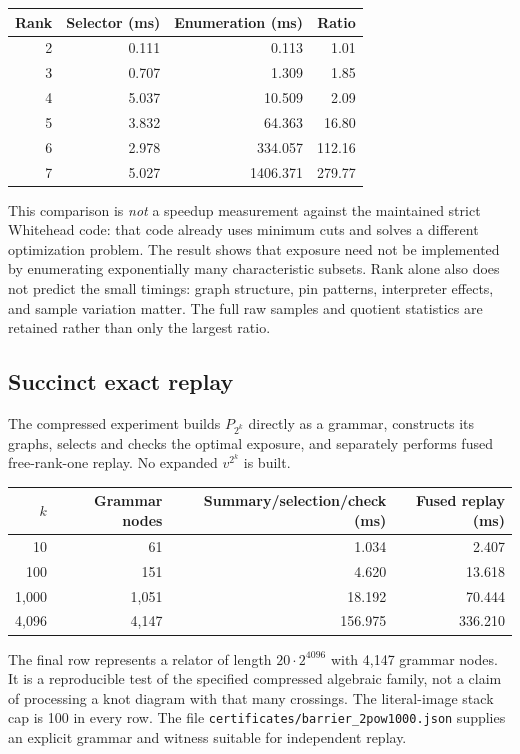 \documentclass[11pt,letterpaper]{article}
\theoremstyle{definition}\newtheorem{definition}[theorem]{Definition}
\begin{document}
\begin{center}
\begin{tabular}{rrrr}
\toprule Rank & Selector (ms) & Enumeration (ms) & Ratio\\\midrule
2 & 0.111 & 0.113 & 1.01\\
3 & 0.707 & 1.309 & 1.85\\
4 & 5.037 & 10.509 & 2.09\\
5 & 3.832 & 64.363 & 16.80\\
6 & 2.978 & 334.057 & 112.16\\
7 & 5.027 & 1406.371 & 279.77\\
\bottomrule
\end{tabular}
\end{center}

This comparison is \emph{not} a speedup measurement against the maintained strict Whitehead code: that code already uses minimum cuts and solves a different optimization problem. The result shows that exposure need not be implemented by enumerating exponentially many characteristic subsets. Rank alone also does not predict the small timings: graph structure, pin patterns, interpreter effects, and sample variation matter. The full raw samples and quotient statistics are retained rather than only the largest ratio.

\subsection{Succinct exact replay}
The compressed experiment builds $P_{2^k}$ directly as a grammar, constructs its graphs, selects and checks the optimal exposure, and separately performs fused free-rank-one replay. No expanded $v^{2^k}$ is built.

\begin{center}
\begin{tabular}{rrrr}
\toprule $k$ & Grammar nodes & Summary/selection/check (ms) & Fused replay (ms)\\\midrule
10 & 61 & 1.034 & 2.407\\
100 & 151 & 4.620 & 13.618\\
1,000 & 1,051 & 18.192 & 70.444\\
4,096 & 4,147 & 156.975 & 336.210\\
\bottomrule
\end{tabular}
\end{center}

The final row represents a relator of length $20\cdot2^{4096}$ with 4,147 grammar nodes. It is a reproducible test of the specified compressed algebraic family, not a claim of processing a knot diagram with that many crossings. The literal-image stack cap is 100 in every row. The file \texttt{certificates/barrier\_2pow1000.json} supplies an explicit grammar and witness suitable for independent replay.
\end{document}
